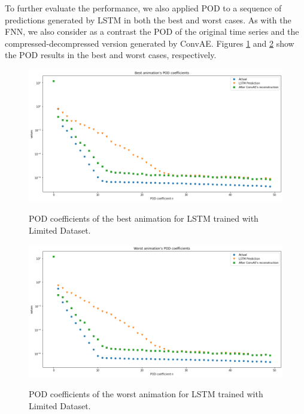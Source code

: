 To further evaluate the performance, we also applied POD to a sequence of predictions generated by LSTM in both the best and worst cases. As with the FNN, we also consider as a contrast the POD of the original time series and the compressed-decompressed version generated by ConvAE. Figures \ref{figure:LSTM_limited_best_POD} and \ref{figure:LSTM_limited_worst_POD} show the POD results in the best and  worst cases, respectively.

\begin{figure}[H]
    \centering
    \caption{POD coefficients of the best animation for LSTM trained with Limited Dataset.}
    \includegraphics[scale=0.4]{figures/mantle_convection_images/limited_dataset/LSTM_Best_POD.png}
    \label{figure:LSTM_limited_best_POD}
\end{figure}

\begin{figure}[H]
    \centering
    \caption{POD coefficients of the worst animation for LSTM trained with Limited Dataset.}
    \includegraphics[scale=0.4]{figures/mantle_convection_images/limited_dataset/LSTM_Worst_POD.png}
    \label{figure:LSTM_limited_worst_POD}
\end{figure}

